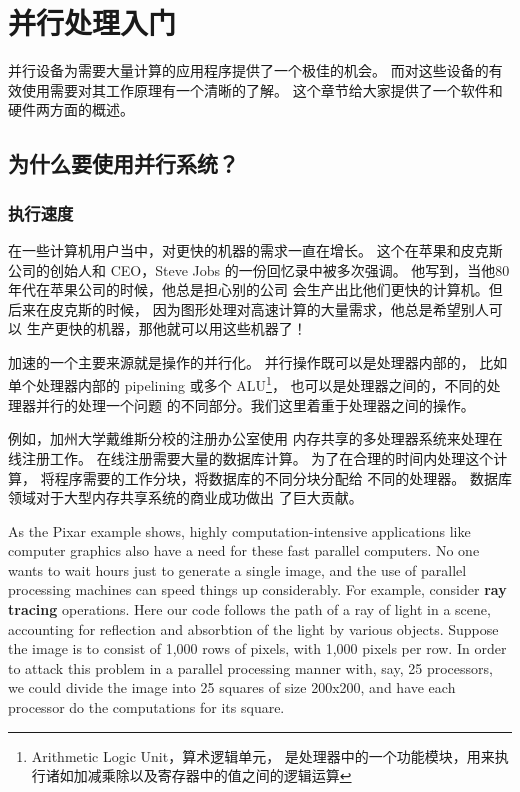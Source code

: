 \chapter{并行处理入门}
\label{chap:intro}

并行设备为需要大量计算的应用程序提供了一个极佳的机会。
而对这些设备的有效使用需要对其工作原理有一个清晰的了解。
这个章节给大家提供了一个软件和硬件两方面的概述。

\section{为什么要使用并行系统？}

\subsection{执行速度}

在一些计算机用户当中，对更快的机器的需求一直在增长。
这个在苹果和皮克斯公司的创始人和 CEO，Steve Jobs 的一份回忆录中被多次强调。
他写到，当他80年代在苹果公司的时候，他总是担心别的公司
会生产出比他们更快的计算机。但后来在皮克斯的时候，
因为图形处理对高速计算的大量需求，他总是希望别人可以
生产更快的机器，那他就可以用这些机器了！

加速的一个主要来源就是操作的并行化。
并行操作既可以是处理器内部的，
比如单个处理器内部的 pipelining 或多个 ALU\footnote{Arithmetic Logic Unit，算术逻辑单元，
是处理器中的一个功能模块，用来执行诸如加减乘除以及寄存器中的值之间的逻辑运算}，
也可以是处理器之间的，不同的处理器并行的处理一个问题
的不同部分。我们这里着重于处理器之间的操作。

例如，加州大学戴维斯分校的注册办公室使用
内存共享的多处理器系统来处理在线注册工作。
在线注册需要大量的数据库计算。
为了在合理的时间内处理这个计算，
将程序需要的工作分块，将数据库的不同分块分配给
不同的处理器。
数据库领域对于大型内存共享系统的商业成功做出
了巨大贡献。


As the Pixar example shows, highly computation-intensive applications
like computer graphics also have a need for these fast parallel
computers. No one wants to wait hours just to generate a single image,
and the use of parallel processing machines can speed things up
considerably. For example, consider \textbf{ray tracing} operations.
Here our code follows the path of a ray of light in a scene, accounting
for reflection and absorbtion of the light by various objects. Suppose
the image is to consist of 1,000 rows of pixels, with 1,000 pixels per
row.  In order to attack this problem in a parallel processing manner
with, say, 25 processors, we could divide the image into 25 squares of
size 200x200, and have each processor do the computations for its
square.

